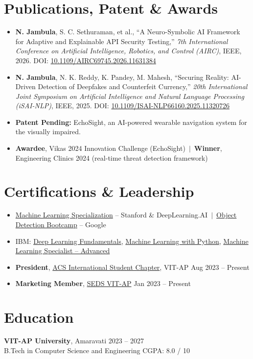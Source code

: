 \documentclass[a4paper,10pt]{article}
\begin{document}
\section{Publications, Patent \& Awards}
\begin{itemize}
  \item \textbf{N. Jambula}, S. C. Sethuraman, et al., ``A Neuro-Symbolic AI Framework for Adaptive and Explainable API Security Testing,'' \textit{7th International Conference on Artificial Intelligence, Robotics, and Control (AIRC)}, IEEE, 2026.
        DOI: \href{https://doi.org/10.1109/AIRC69745.2026.11631384}{10.1109/AIRC69745.2026.11631384}
  \item \textbf{N. Jambula}, N. K. Reddy, K. Pandey, M. Mahesh, ``Securing Reality: AI-Driven Detection of Deepfakes and Counterfeit Currency,'' \textit{20th International Joint Symposium on Artificial Intelligence and Natural Language Processing (iSAI-NLP)}, IEEE, 2025.
        DOI: \href{https://doi.org/10.1109/ISAI-NLP66160.2025.11320726}{10.1109/ISAI-NLP66160.2025.11320726}
  \item \textbf{Patent Pending:} EchoSight, an AI-powered wearable navigation system for the visually impaired.
  \item \textbf{Awardee}, Vikas 2024 Innovation Challenge (EchoSight) \,$|$\, \textbf{Winner}, Engineering Clinics 2024 (real-time threat detection framework)
\end{itemize}

\section{Certifications \& Leadership}
\begin{itemize}
  \item \href{https://drive.google.com/file/d/1bYBUAIvUOMfzw3lgQpruA0vFzStBH2Kx/view?usp=sharing}{Machine Learning Specialization} -- Stanford \& DeepLearning.AI \,$|$\, \href{https://www.cert.devtown.in/verify/Z1GAbEE}{Object Detection Bootcamp} -- Google
  \item IBM: \href{https://courses.cognitiveclass.ai/certificates/b24fd91a07c14d8ba2b6dbf0d6a6c6c5}{Deep Learning Fundamentals}, \href{https://www.credly.com/badges/91a4bb99-9a17-4c7c-b000-3c7e54c148eb/print}{Machine Learning with Python}, \href{https://www.credly.com/badges/1d70a2bb-7afa-4ef8-9e2f-a945321c0e51/print}{Machine Learning Specialist -- Advanced}
  \item \textbf{President}, \href{https://acsvitap.in/}{ACS International Student Chapter}, VIT-AP \hfill Aug 2023 -- Present
  \item \textbf{Marketing Member}, \href{https://sedsvitap.in/index.html}{SEDS VIT-AP} \hfill Jan 2023 -- Present
\end{itemize}

\section{Education}
\textbf{VIT-AP University}, Amaravati \hfill 2023 -- 2027\\
B.Tech in Computer Science and Engineering \hfill CGPA: 8.0 / 10
\end{document}
